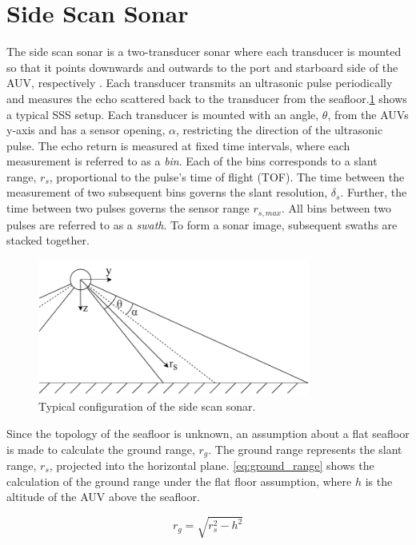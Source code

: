 \section{Side Scan Sonar}

The side scan sonar is a two-transducer sonar where each transducer is mounted so that it points downwards and outwards to the port and starboard side of the AUV, respectively \cite{Burguera2016High-ResolutionSonar}. Each transducer transmits an ultrasonic pulse periodically and measures the echo scattered back to the transducer from the seafloor.\cref{fig:sss} shows a typical SSS setup. Each transducer is mounted with an angle, $\theta$, from the AUVs y-axis and has a sensor opening, $\alpha$, restricting the direction of the ultrasonic pulse. The echo return is measured at fixed time intervals, where each measurement is referred to as a \textit{bin}. Each of the bins corresponds to a slant range, $r_s$, proportional to the pulse's time of flight (TOF). The time between the measurement of two subsequent bins governs the slant resolution, $\delta_s$. Further, the time between two pulses governs the sensor range $r_{s,max}$. All bins between two pulses are referred to as a \textit{swath}. To form a sonar image, subsequent swaths are stacked together.

\begin{figure}
    \centering
    \includegraphics[width=0.8\textwidth]{figures/sss.drawio.pdf}
    \caption{Typical configuration of the side scan sonar.}
    \label{fig:sss}
\end{figure}

Since the topology of the seafloor is unknown, an assumption about a flat seafloor is made to calculate the ground range, $r_g$. The ground range represents the slant range, $r_s$, projected into the horizontal plane. \cref{eq:ground_range} shows the calculation of the ground range under the flat floor assumption, where $h$ is the altitude of the AUV above the seafloor.

\begin{equation}
    r_g = \sqrt{r_s^2 - h^2}
    \label{eq:ground_range}
\end{equation}

